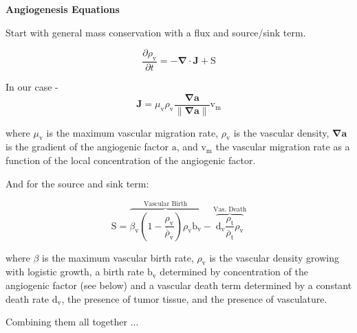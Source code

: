 \documentclass[10point]{article}
\newcommand{\beq}{\begin{equation}}
\newcommand{\eeq}{\end{equation}}
\renewcommand{\vec}[1]{\mathbf{#1}}
\begin{document}
\begin{center}\textbf{Angiogenesis Equations} \end{center}

Start with general mass conservation with a flux and source/sink term.

\beq
     \frac{\partial \rho_{\textrm{v}}}{\partial t} = -\vec{\nabla} \cdot \vec{J} + \textrm{S}
\eeq

In our case - 
\beq
 \vec{J} = \mu_{\textrm{v}} \rho_{\textrm{v}} \frac{\vec{\nabla a}}{\parallel \vec{\nabla a} \parallel} \textrm{v}_{\textrm{m}} 
\eeq

where $\mu_{\textrm{v}}$ is the maximum vascular migration rate, $\rho_{\textrm{v}}$ is the vascular density, $\vec{\nabla a}$ is the gradient of the angiogenic factor $\textrm{a}$, and $\textrm{v}_{\textrm{m}}$ the vascular migration rate as a function of the local concentration of the angiogenic factor.  
\newline

And for the source and sink term:


\beq
\textrm{S} = \overbrace{\beta_{\textrm{v}} (1 - \frac{\rho_{\textrm{v}}}{\overline{\rho}_{\textrm{v}}}) \rho_{\textrm{v}}\textrm{b}_{\textrm{v}}}^{ \textrm{Vascular Birth}} - \overbrace{\textrm{d}_{\textrm{v}} \frac{\rho_{\textrm{t}}}{\overline{\rho}_{\textrm{t}}} \rho_{\textrm{v}}}^{ \textrm {Vas. Death}}
\eeq

where $\beta$ is the maximum vascular birth rate,  $\rho_{\textrm{v}}$ is the vascular density growing with logistic growth,  a birth rate $\textrm{b}_{\textrm{v}}$ determined by concentration of the angiogenic factor (see below) and a vascular death term determined by a constant death rate $\textrm{d}_{\textrm{v}}$, the presence of tumor tissue, and the presence of vasculature. 
\newline

Combining them all together ... 
\end{document}
